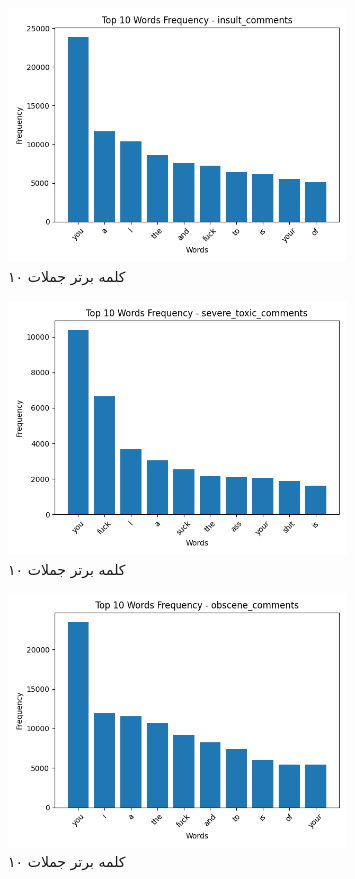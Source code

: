 \begin{figure}
  \centering
  \includegraphics[width=0.8\textwidth]{stats/top_ten_histogram_insult_comments.png}
  \caption{۱۰ کلمه برتر جملات }
  \label{fig:unique_common_words_total}
\end{figure}

\begin{figure}
  \centering
  \includegraphics[width=0.8\textwidth]{stats/top_ten_histogram_severe_toxic_comments.png}
  \caption{۱۰ کلمه برتر جملات }
  \label{fig:unique_uncommon_words_count}
\end{figure}

\begin{figure}
  \centering
  \includegraphics[width=0.8\textwidth]{stats/top_ten_histogram_obscene_comments.png}
  \caption{۱۰ کلمه برتر جملات }
  \label{fig:unique_common_words_total}
\end{figure}

